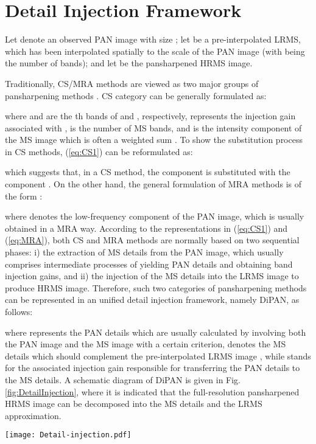 \documentclass[journal]{IEEEtran}
\begin{document}
\section{Detail Injection Framework} \label{sec:DetailInjection}

Let  denote an observed PAN image with size ; let  be a pre-interpolated LRMS, which has been interpolated spatially to the scale of the PAN image (with  being the number of bands); and let  be the pansharpened HRMS image.

Traditionally, CS/MRA methods are viewed as two major groups of pansharpening methods \cite{Survey:Vivone2015}. CS category can be generally formulated as:

where  and  are the th bands of  and , respectively,  represents the injection gain associated with ,  is the number of MS bands, and  is the intensity component of the MS image which is often a weighted sum . To show the substitution process in CS methods, (\ref{eq:CS1}) can be reformulated as:

which suggests that, in a CS method, the component  is substituted with the component .
On the other hand, the general formulation of MRA methods is of the form \cite{Survey:Vivone2015}:

where  denotes the low-frequency component of the PAN image, which is usually obtained in a MRA way. According to the representations in (\ref{eq:CS1}) and (\ref{eq:MRA}), both CS and MRA methods are normally based on two sequential phases: i) the extraction of MS details from the PAN image, which usually comprises intermediate processes of yielding PAN details and obtaining band injection gains, and ii) the injection of the MS details into the LRMS image to produce HRMS image. Therefore, such two categories of pansharpening methods can be represented in an unified detail injection framework, namely DiPAN, as follows:

where  represents the PAN details which are usually calculated by involving both the PAN image and the MS image with a certain criterion,  denotes the MS details which should complement the pre-interpolated LRMS image , while  stands for the associated injection gain responsible for transferring the PAN details to the MS details. A schematic diagram of DiPAN is given in Fig. \ref{fig:DetailInjection}, where it is indicated that the full-resolution pansharpened HRMS image  can be decomposed into the MS details and the LRMS approximation.

\begin{figure*}[t]\scriptsize
\centering
\texttt{[image: Detail-injection.pdf]}
\caption{Schematic diagram of the DiPAN framework.}
\label{fig:DetailInjection}
\end{figure*}
\end{document}
